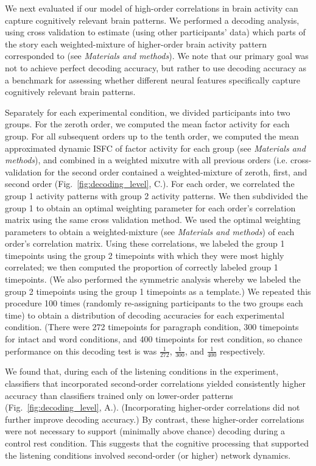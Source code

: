 \documentclass[english]{article}
\begin{document}
We next evaluated if our model of high-order correlations in brain activity can capture cognitively relevant brain patterns. We performed a decoding analysis, using cross validation to estimate (using other participants’ data) which parts of the story each weighted-mixture of higher-order brain activity pattern corresponded to (see \textit{Materials and methods}). We note that our primary goal was not to achieve perfect decoding accuracy, but rather to use decoding accuracy as a benchmark for assessing whether different neural features specifically capture cognitively relevant brain patterns.

Separately for each experimental condition, we divided participants
into two groups. For the zeroth order, we computed the mean factor
activity for each group.  For all subsequent orders up to the tenth
order, we computed the mean approximated dynamic ISFC of factor
activity for each group (see \textit{Materials and methods}), and
combined in a weighted mixutre with all previous orders
(i.e. cross-validation for the second
order contained a weighted-mixture of zeroth, first, and second order (Fig.~\ref{fig:decoding_level},  C.).  For
each order, we correlated the group 1 activity patterns with group 2
activity patterns.  We then subdivided the group 1 to obtain an
optimal weighting parameter for each order’s correlation matrix using
the same cross validation method. We used the optimal weighting
parameters to obtain a weighted-mixture (see \textit{Materials and methods}) of each order’s correlation
matrix. Using these correlations, we labeled the group 1 timepoints
using the group 2 timepoints with which they were most highly
correlated; we then computed the proportion of correctly labeled group
1 timepoints. (We also performed the symmetric analysis whereby we
labeled the group 2 timepoints using the group 1 timepoints as a
template.) We repeated this procedure 100 times (randomly re-assigning
participants to the two groups each time) to obtain a distribution of
decoding accuracies for each experimental condition. (There were 272
timepoints for paragraph condition, 300 timepoints for intact and word
conditions, and 400 timepoints for rest condition,  so chance
performance on this decoding test is was $\frac{1}{272}$,
$\frac{1}{300}$, and $\frac{1}{400}$ respectively.

We found that, during each of the listening conditions in the
experiment, classifiers that incorporated second-order correlations
yielded consistently higher accuracy than classifiers trained only on
lower-order patterns (Fig.~\ref{fig:decoding_level},  A.).  (Incorporating higher-order correlations did
not further improve decoding accuracy.)  By contrast, these
higher-order correlations were not necessary to support (minimally
above chance) decoding during a control rest condition.  This suggests
that the cognitive processing that supported the listening conditions
involved second-order (or higher) network dynamics. 
\end{document}
